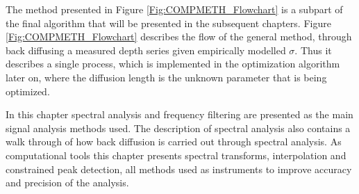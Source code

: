 \documentclass[../../CompleteThesis2/Complete_2ndDraft]{subfiles}
\begin{document}
The method presented in Figure \ref{Fig:COMPMETH_Flowchart} is a subpart of the final algorithm that will be presented in the subsequent chapters. Figure \ref{Fig:COMPMETH_Flowchart} describes the flow of the general method, through back diffusing a measured depth series given empirically modelled $\sigma$. Thus it describes a single process, which is implemented in the optimization algorithm later on, where the diffusion length is the unknown parameter that is being optimized.

In this chapter spectral analysis and frequency filtering are presented as the main signal analysis methods used. The description of spectral analysis also contains a walk through of how back diffusion is carried out through spectral analysis. As computational tools this chapter presents spectral transforms, interpolation and constrained peak detection, all methods used as instruments to improve accuracy and precision of the analysis.
\end{document}

